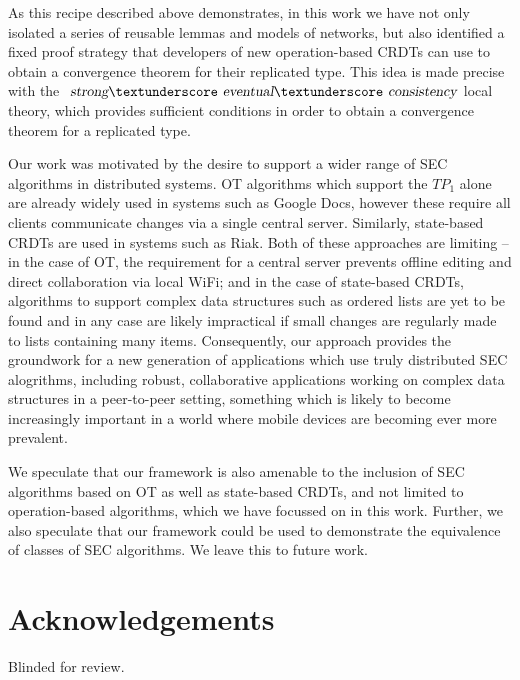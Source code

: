 \documentclass[acmlarge,review,anonymous]{acmart}\settopmatter{printfolios=true}
\begin{document}
As this recipe described above demonstrates, in this work we have not only isolated a series of reusable lemmas and models of networks, but also identified a fixed proof strategy that developers of new operation-based CRDTs can use to obtain a convergence theorem for their replicated type.
This idea is made precise with the $\isa{strong}{\isacharunderscore}\isa{eventual}{\isacharunderscore}\isa{consistency}$ local theory, which provides sufficient conditions in order to obtain a convergence theorem for a replicated type.

Our work was motivated by the desire to support a wider range of SEC algorithms in distributed systems.
OT algorithms which support the $\mathit{TP}_1$ alone are already widely used in systems such as Google Docs, however these require all clients communicate changes via a single central server.
Similarly, state-based CRDTs are used in systems such as Riak. Both of these approaches are limiting -- in the case of OT, the requirement for a central server prevents offline editing and direct collaboration via local WiFi; and in the case of state-based CRDTs, algorithms to support complex data structures such as ordered lists are yet to be found and in any case are likely impractical if small changes are regularly made to lists containing many items.
Consequently, our approach provides the groundwork for a new generation of applications which use truly distributed SEC alogrithms, including robust, collaborative applications working on complex data structures in a peer-to-peer setting, something which is likely to become increasingly important in a world where mobile devices are becoming ever more prevalent.

We speculate that our framework is also amenable to the inclusion of SEC algorithms based on OT as well as state-based CRDTs, and not limited to operation-based algorithms, which we have focussed on in this work.
Further, we also speculate that our framework could be used to demonstrate the equivalence of classes of SEC algorithms.
We leave this to future work.

\section*{Acknowledgements}

Blinded for review.


{}


\end{document}

